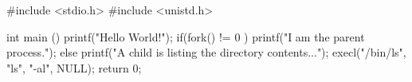 \documentclass[varwidth=30.5em,crop]{standalone}
\begin{document}
\begin{ccode}
#include <stdio.h> 
#include <unistd.h> 

int main () 
{ 
  printf("Hello World!\n"); 
  if(fork() != 0 )
    printf("I am the parent process.\n");
  else {
    printf("A child is listing the directory contents...\n");    
    execl("/bin/ls", "ls", "-al", NULL);
  }
  return 0;
}  
\end{ccode}
\end{document}
